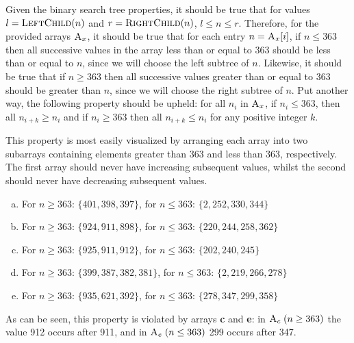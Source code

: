 Given the binary search tree properties, it should be true that for values $ l = \textsc{LeftChild}(n) $ and $ r = \textsc{RightChild}(n) $, $ l \leq n \leq r $. Therefore, for the provided arrays $ \textsc{A}_x $, it should be true that for each entry $ n = \textsc{A}_x[i] $, if $ n \leq 363 $ then all successive values in the array less than or equal to $ 363 $ should be less than or equal to $ n $, since we will choose the left subtree of $ n $. Likewise, it should be true that if $ n \geq 363 $ then all successive values greater than or equal to $ 363 $ should be greater than $ n $, since we will choose the right subtree of $ n $. Put another way, the following property should be upheld: for all $ n_i $ in $ \textsc{A}_x $, if $ n_i \leq 363 $, then all $ n_{i+k} \geq n_i $ and if $ n_i \geq 363 $ then all $ n_{i+k} \leq n_i $ for any positive integer $ k $.

This property is most easily visualized by arranging each array into two subarrays containing elements greater than 363 and less than 363, respectively. The first array should never have increasing subsequent values, whilst the second should never have decreasing subsequent values.
\newcommand{\listarrays}[2]{\item For $ n \geq 363 $: $ \{ #1 \} $, for $ n \leq 363 $: $ \{ #2 \} $}
\begin{enumerate}[(a)]
	\listarrays{ 401, 398, 397 }{ 2, 252, 330, 344 }
	\listarrays{ 924, 911, 898 }{ 220, 244, 258, 362 }
	\listarrays{ 925, 911, 912 }{ 202, 240, 245 }
	\listarrays{ 399, 387, 382, 381 }{ 2, 219, 266, 278 }
	\listarrays{ 935, 621, 392 }{ 278, 347, 299, 358 }
\end{enumerate}

As can be seen, this property is violated by arrays \textbf{c} and \textbf{e}: in $ \textsc{A}_c \; (n \geq 363) $ the value 912 occurs after 911, and in $ \textsc{A}_e \; (n \leq 363) $ 299 occurs after 347.